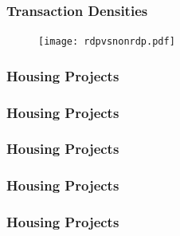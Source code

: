 \documentclass[aspectratio=149]{beamer}
\begin{document}

\begin{frame}
\frametitle{Transaction Densities}
\begin{center}
\begin{figure}
\texttt{[image: rdpvsnonrdp.pdf]}
\vspace{-3mm}
\end{figure}
\end{center}
\end{frame}



\begin{frame}
\frametitle{Housing Projects}
\vspace{-1.5mm}
\begin{table}
{\footnotesize

}
\end{table}
\end{frame}


\begin{frame}
\frametitle{Housing Projects}
\vspace{-1.5mm}
\begin{table}
{\footnotesize

}
\end{table}
\end{frame}


\begin{frame}
\frametitle{Housing Projects}
\vspace{-1.5mm}
\begin{table}
{\footnotesize

}
\end{table}
\end{frame}


\begin{frame}
\frametitle{Housing Projects}
\vspace{-1.5mm}
\begin{table}
{\footnotesize

}
\end{table}
\end{frame}


\begin{frame}
\frametitle{Housing Projects}
\vspace{-1.5mm}
\begin{table}
{\footnotesize

}
\end{table}
\end{frame}
\end{document}

